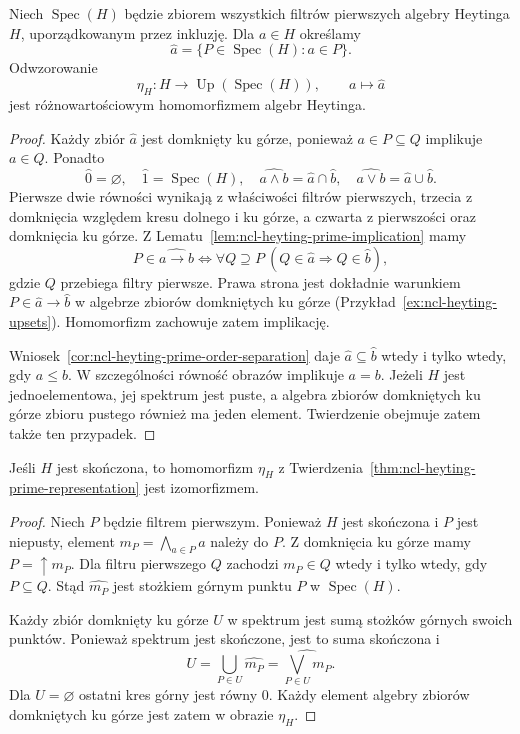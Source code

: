 \begin{twierdzenie}
\label{thm:ncl-heyting-prime-representation}
Niech $\operatorname{Spec}(H)$ będzie zbiorem
wszystkich filtrów pierwszych algebry Heytinga $H$,
uporządkowanym przez inkluzję.
Dla $a\in H$ określamy
\[
 \widehat a=\{P\in\operatorname{Spec}(H):a\in P\}.
\]
Odwzorowanie
\[
 \eta_H:H\longrightarrow
 \operatorname{Up}(\operatorname{Spec}(H)),
 \qquad a\longmapsto\widehat a
\]
jest różnowartościowym homomorfizmem algebr Heytinga.
\end{twierdzenie}
\begin{proof}
Każdy zbiór $\widehat a$ jest domknięty ku górze,
ponieważ $a\in P\subseteq Q$ implikuje $a\in Q$.
Ponadto
\[
 \widehat0=\varnothing,\quad
 \widehat1=\operatorname{Spec}(H),\quad
 \widehat{a\wedge b}=\widehat a\cap\widehat b,\quad
 \widehat{a\vee b}=\widehat a\cup\widehat b.
\]
Pierwsze dwie równości wynikają z właściwości
filtrów pierwszych, trzecia z domknięcia względem
kresu dolnego i ku górze, a czwarta z pierwszości
oraz domknięcia ku górze.
Z Lematu~\ref{lem:ncl-heyting-prime-implication}
mamy
\[
 P\in\widehat{a\to b}
 \iff \forall Q\supseteq P\
 (Q\in\widehat a\Longrightarrow Q\in\widehat b),
\]
gdzie $Q$ przebiega filtry pierwsze.
Prawa strona jest dokładnie warunkiem
$P\in\widehat a\to\widehat b$ w algebrze
zbiorów domkniętych ku górze
(Przykład~\ref{ex:ncl-heyting-upsets}).
Homomorfizm zachowuje zatem implikację.

Wniosek~\ref{cor:ncl-heyting-prime-order-separation}
daje $\widehat a\subseteq\widehat b$ wtedy i tylko
wtedy, gdy $a\leq b$. W szczególności równość
obrazów implikuje $a=b$.
Jeżeli $H$ jest jednoelementowa, jej spektrum
jest puste, a algebra zbiorów domkniętych ku górze
zbioru pustego również ma jeden element.
Twierdzenie obejmuje zatem także ten przypadek.
\end{proof}

\begin{twierdzenie}
\label{thm:ncl-heyting-finite-prime-representation}
Jeśli $H$ jest skończona, to homomorfizm $\eta_H$
z Twierdzenia~\ref{thm:ncl-heyting-prime-representation}
jest izomorfizmem.
\end{twierdzenie}
\begin{proof}
Niech $P$ będzie filtrem pierwszym.
Ponieważ $H$ jest skończona i $P$ jest niepusty,
element $m_P=\bigwedge_{a\in P}a$ należy do $P$.
Z domknięcia ku górze mamy $P=\uparrow m_P$.
Dla filtru pierwszego $Q$ zachodzi
$m_P\in Q$ wtedy i tylko wtedy, gdy $P\subseteq Q$.
Stąd $\widehat{m_P}$ jest stożkiem górnym
punktu $P$ w $\operatorname{Spec}(H)$.

Każdy zbiór domknięty ku górze $U$ w spektrum
jest sumą stożków górnych swoich punktów.
Ponieważ spektrum jest skończone, jest to
suma skończona i
\[
 U=\bigcup_{P\in U}\widehat{m_P}
   =\widehat{\bigvee_{P\in U}m_P}.
\]
Dla $U=\varnothing$ ostatni kres górny jest
równy $0$. Każdy element algebry zbiorów
domkniętych ku górze jest zatem w obrazie $\eta_H$.
\end{proof}

